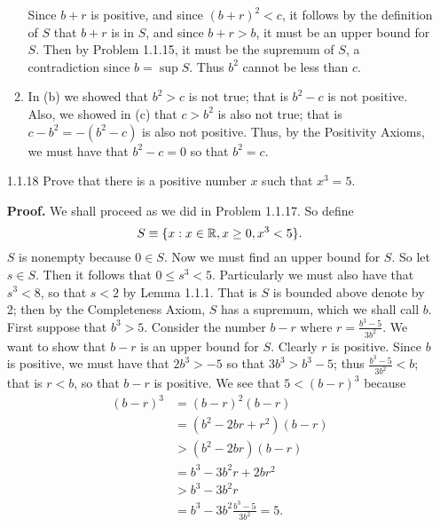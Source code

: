 \begin{enumerate}
\begin{enumerate}
               Since $b + r$ is positive, and since $(b + r)^2 < c$, it follows
               by the definition of $S$ that $b + r$ is in $S$, and since
               $b + r > b$, it must be an upper bound for $S$. Then by Problem
               1.1.15, it must be the supremum of $S$, a contradiction since
               $b = \sup S$. Thus $b^2$ cannot be less than $c$.
         \item In (b) we showed that $b^2 > c$ is not true; that is $b^2 - c$ is
               not positive. Also, we showed in (c) that $c > b^2$ is also not
               true; that is $c - b^2 = -(b^2 - c)$ is also not positive. Thus,
               by the Positivity Axioms, we must have that $b^2 - c = 0$ so that
               $b^2 = c$.
                  
      \end{enumerate}
   \item[1.1.18]  Prove that there is a positive number $x$ such that $x^3 = 5$.
 
      \textbf{Proof.} We shall proceed as we did in Problem 1.1.17. So define
      $$S \equiv \{x : x \in \mathbb{R}, x \ge 0, x^3 < 5\}.$$ $S$ is nonempty because
      $0 \in S$. Now we must find an upper bound for $S$. So let $s \in S$. Then
      it follows that $0 \le s^3 < 5$. Particularly we must also have that
      $s^3 < 8$, so that $s < 2$ by Lemma 1.1.1. That is $S$ is bounded above 
      denote by 2; then by the Completeness Axiom, $S$ has a supremum, which we 
      shall call $b$. First suppose that $b^3 > 5$. Consider the number $b - r$ 
      where $r = \frac{b^3 - 5}{3b^2}$. We want to show that $b - r$ is an upper 
      bound for $S$. Clearly $r$ is positive. Since $b$ is positive, we must
      have that $2b^3 > -5$ so that $3b^3 > b^3 - 5$; thus
      $\frac{b^3 - 5}{3b^2} < b$; that is $r < b$, so that $b - r$ is positive. 
      We see that $5 < (b - r)^3$ because
      \begin{align*}
         (b - r)^3 &= (b - r)^2(b - r) \\
                   &= (b^2 - 2br + r^2)(b - r) \\
                   &> (b^2 - 2br)(b - r) \\
                   &= b^3 - 3b^2r + 2br^2 \\
                   &> b^3 - 3b^2r \\
                   &= b^3 - 3b^2\frac{b^3 - 5}{3b^2} = 5.
      \end{align*}


\end{enumerate}
